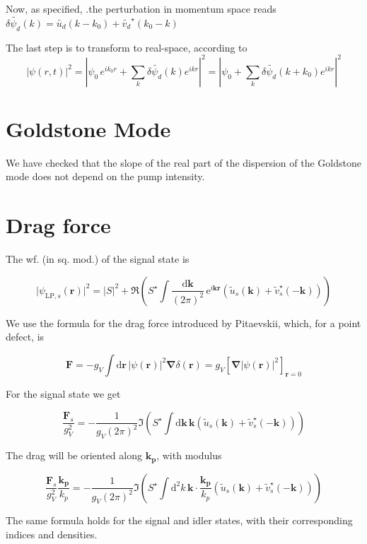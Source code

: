 \documentclass[a4paper,prb,10pt,aps,twocolumn]{revtex4-1}
\newcommand{\vect}[1]{\boldsymbol{#1}}
\begin{document}
Now, as specified, .the perturbation in momentum space reads 
$\delta\widetilde{\psi_{d}}(k)=\widetilde{u_{d}}(k-
k_{0})+\widetilde{v_{d}}^{\star}(k_{0}-k)$

The last step is to transform to real-space, according to
\[
\left|\psi(r,t)\right|^{2}=\left|\psi_{0}\, 
e^{ik_{0}r}+\sum_{k}\delta\widetilde{\psi_{d}}
(k)e^{ikr}\right|^{2}=\left|\psi_{0}+\sum_{k}\delta\widetilde{\psi_{d}}
(k+k_{0})e^{ikr}\right|^{2}
\]


\section{Goldstone Mode}
\label{sec:goldstone}

We have checked that the slope of the real part of the dispersion of the 
Goldstone mode does not depend on the pump intensity.

\section{Drag force}
\label{sec:drag}

The wf. (in sq. mod.) of the signal state is

\begin{equation}
\vert \psi_{\text{LP},s}(\vect{r})\vert^2 = \vert S \vert^2 + \Re\left( S^{\star} 
\int \frac{\mathrm{d}\vect{k}}{(2 \pi)^2}\, \mathrm{e}^{i \vect{k} \vect{r}} 
\left( \widetilde{u}_s(\vect{k}) + \widetilde{v}_s^{\star}(-\vect{k}) \right) 
\right)
\end{equation}

We use the formula for the drag force introduced by Pitaevskii, which, for a 
point defect, is

\begin{equation}
\vect{F}= - g_V \int \mathrm{d} \vect{r} \, \vert \psi(\vect{r}) \vert ^2 
\vect{\nabla} \delta(\vect{r}) = g_V \left[ \vect{\nabla} \vert \psi(\vect{r}) 
\vert ^2 \right]_{\vect{r}=0}
\end{equation}

For the signal state we get

\begin{equation}
\frac{\vect{F}_s}{g_V^2} = -\frac{1}{g_V (2 \pi)^2} \Im \left( S^{\star} \int 
\mathrm{d}\vect{k} \, \vect{k} \left( \widetilde{u}_s(\vect{k}) + 
\widetilde{v}_s^{\star}(-\vect{k}) \right) \right)
\end{equation}

The drag will be oriented along $\vect{k_p}$, with modulus

\begin{equation}
\frac{\vect{F}_s}{g_V^2} \frac{\vect{k_p}}{k_p} = -\frac{1}{g_V (2 \pi)^2} \Im 
\left( S^{\star} \int \mathrm{d}^2 k \, \vect{k} \cdot \frac{\vect{k_p}}{k_p} 
\left( \widetilde{u}_s(\vect{k}) + \widetilde{v}_s^{\star}(-\vect{k}) \right) 
\right)
\end{equation}

The same formula holds for the signal and idler states, with their corresponding 
indices and densities.



\end{document}
